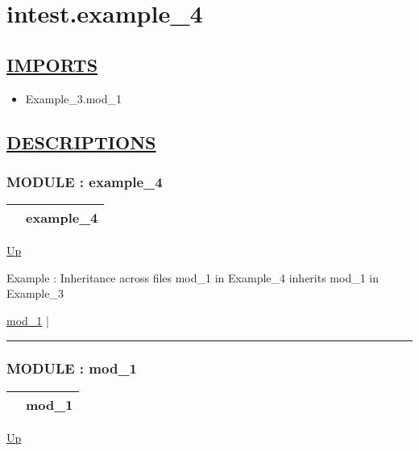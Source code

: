\chapter*{intest.example\_4}
\hypertarget{ecldoc:toc:intest.example_4}{}

\section*{\underline{IMPORTS}}
\begin{itemize}
\item Example\_3.mod\_1
\end{itemize}

\section*{\underline{DESCRIPTIONS}}
\subsection*{MODULE : example\_4}
\hypertarget{ecldoc:intest.example_4}{}

{\renewcommand{\arraystretch}{1.5}
\begin{tabularx}{\textwidth}{|>{\raggedright\arraybackslash}l|X|}
\hline
\hspace{0pt} & example\_4 \\
\hline
\end{tabularx}
}

\hyperlink{ecldoc:toc:intest}{Up}

\par
Example : Inheritance across files mod\_1 in Example\_4 inherits mod\_1 in Example\_3


\hyperlink{ecldoc:intest.example_4.mod_1}{mod\_1}  |

\rule{\textwidth}{0.4pt}

\subsection*{MODULE : mod\_1}
\hypertarget{ecldoc:intest.example_4.mod_1}{}

{\renewcommand{\arraystretch}{1.5}
\begin{tabularx}{\textwidth}{|>{\raggedright\arraybackslash}l|X|}
\hline
\hspace{0pt} & mod\_1 \\
\hline
\end{tabularx}
}

\hyperlink{ecldoc:intest.example_4}{Up}

